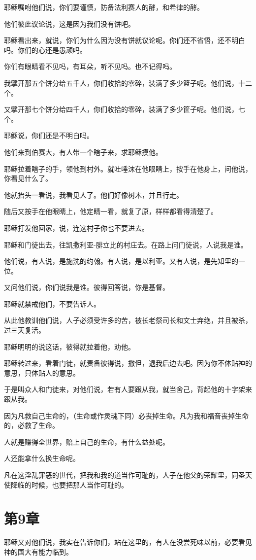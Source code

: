\documentclass[12pt,oneside]{book}
\begin{document}
耶稣嘱咐他们说，你们要谨慎，防备法利赛人的酵，和希律的酵。

他们彼此议论说，这是因为我们没有饼吧。

耶稣看出来，就说，你们为什么因为没有饼就议论呢。你们还不省悟，还不明白吗。你们的心还是愚顽吗。

你们有眼睛看不见吗，有耳朵，听不见吗。也不记得吗。

我擘开那五个饼分给五千人，你们收拾的零碎，装满了多少篮子呢。他们说，十二个。

又擘开那七个饼分给四千人，你们收拾的零碎，装满了多少筐子呢。他们说，七个。

耶稣说，你们还是不明白吗。

他们来到伯赛大，有人带一个瞎子来，求耶稣摸他。

耶稣拉着瞎子的手，领他到村外。就吐唾沫在他眼睛上，按手在他身上，问他说，你看见什么了。

他就抬头一看说，我看见人了。他们好像树木，并且行走。

随后又按手在他眼睛上，他定睛一看，就复了原，样样都看得清楚了。

耶稣打发他回家，说，连这村子你也不要进去。

耶稣和门徒出去，往凯撒利亚-腓立比的村庄去。在路上问门徒说，人说我是谁。

他们说，有人说，是施洗的约翰。有人说，是以利亚。又有人说，是先知里的一位。

又问他们说，你们说我是谁。彼得回答说，你是基督。

耶稣就禁戒他们，不要告诉人。

从此他教训他们说，人子必须受许多的苦，被长老祭司长和文士弃绝，并且被杀，过三天复活。

耶稣明明的说这话，彼得就拉着他，劝他。

耶稣转过来，看着门徒，就责备彼得说，撒但，退我后边去吧。因为你不体贴神的意思，只体贴人的意思。

于是叫众人和门徒来，对他们说，若有人要跟从我，就当舍己，背起他的十字架来跟从我。

因为凡救自己生命的，（生命或作灵魂下同）必丧掉生命。凡为我和福音丧掉生命的，必救了生命。

人就是赚得全世界，赔上自己的生命，有什么益处呢。

人还能拿什么换生命呢。

凡在这淫乱罪恶的世代，把我和我的道当作可耻的，人子在他父的荣耀里，同圣天使降临的时候，也要把那人当作可耻的。

\chapter{第9章}
耶稣又对他们说，我实在告诉你们，站在这里的，有人在没尝死味以前，必要看见神的国大有能力临到。
\end{document}
